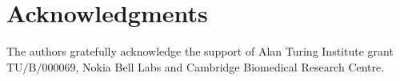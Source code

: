 \setcounter{secnumdepth}{0} %
\section{Acknowledgments}

The authors gratefully acknowledge the support of Alan Turing Institute grant $\text{TU}/\text{B}/000069$, Nokia Bell Labs and Cambridge Biomedical Research Centre.
